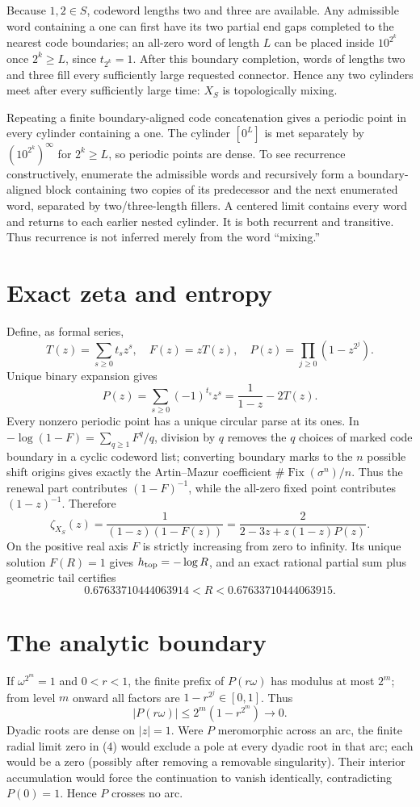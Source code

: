 \documentclass[10pt]{article}
\begin{document}
Because $1,2\in S$, codeword lengths two and three are available.  Any
admissible word containing a one can first have its two partial end gaps
completed to the nearest code boundaries; an all-zero word of length $L$
can be placed inside $10^{2^k}$ once $2^k\geq L$, since $t_{2^k}=1$.
After this boundary completion, words of lengths two and three fill every
sufficiently large requested connector.  Hence any two cylinders meet after
every sufficiently large time: $X_S$ is topologically mixing.

Repeating a finite boundary-aligned code concatenation gives a periodic point
in every cylinder containing a one.  The cylinder $[0^L]$ is met separately
by $(10^{2^k})^\infty$ for $2^k\geq L$, so periodic points are dense.  To see
recurrence constructively, enumerate the admissible words and recursively
form a boundary-aligned block containing two copies of its predecessor and
the next enumerated word, separated by two/three-length fillers.  A centered
limit contains every word and returns to each earlier nested cylinder.  It is
both recurrent and transitive.  Thus recurrence is not inferred merely from
the word ``mixing.''

\section{Exact zeta and entropy}
Define, as formal series,
\[
T(z)=\sum_{s\geq0}t_sz^s,\quad F(z)=zT(z),\quad
P(z)=\prod_{j\geq0}(1-z^{2^j}).
\]
Unique binary expansion gives
\[
P(z)=\sum_{s\geq0}(-1)^{t_s}z^s=\frac1{1-z}-2T(z).
\tag{1}
\]
Every nonzero periodic point has a unique circular parse at its ones.  In
$-\log(1-F)=\sum_{q\geq1}F^q/q$, division by $q$ removes the $q$ choices of
marked code boundary in a cyclic codeword list; converting boundary marks to
the $n$ possible shift origins gives exactly the Artin--Mazur coefficient
$\#\operatorname{Fix}(\sigma^n)/n$.  Thus the renewal
part contributes $(1-F)^{-1}$, while the all-zero fixed point contributes
$(1-z)^{-1}$.  Therefore
\begin{equation}
\zeta_{X_S}(z)=\frac1{(1-z)(1-F(z))}
=\frac{2}{2-3z+z(1-z)P(z)}.                 \tag{2}
\end{equation}
On the positive real axis $F$ is strictly increasing from zero to infinity.
Its unique solution $F(R)=1$ gives $h_{\rm top}=-\log R$, and an exact
rational partial sum plus geometric tail certifies
\[
0.67633710444063914<R<0.67633710444063915.  \tag{3}
\]

\section{The analytic boundary}
If $\omega^{2^m}=1$ and $0<r<1$, the finite prefix of $P(r\omega)$ has
modulus at most $2^m$; from level $m$ onward all factors are
$1-r^{2^j}\in[0,1]$.  Thus
\[
|P(r\omega)|\leq2^m(1-r^{2^m})\longrightarrow0.             \tag{4}
\]
Dyadic roots are dense on $|z|=1$.  Were $P$ meromorphic across an arc, the
finite radial limit zero in (4) would exclude a pole at every dyadic root in
that arc; each would be a zero (possibly after removing a removable
singularity).  Their interior accumulation would force the continuation to
vanish identically, contradicting $P(0)=1$.  Hence $P$ crosses no arc.
\end{document}

